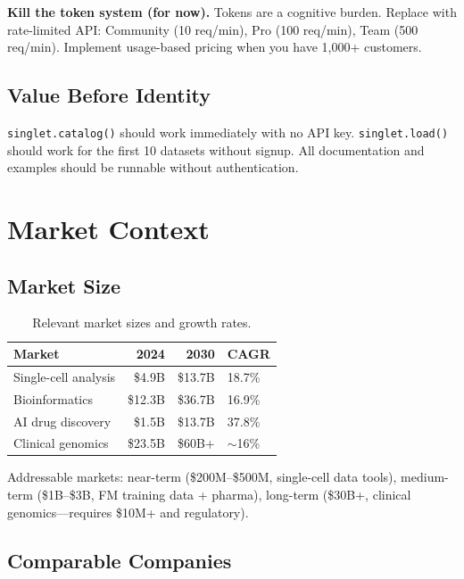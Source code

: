 \documentclass[10pt,twocolumn,letterpaper]{article}
\begin{document}
\textbf{Kill the token system (for now).} Tokens are a cognitive burden. Replace
with rate-limited API: Community (10 req/min), Pro (100 req/min), Team
(500 req/min). Implement usage-based pricing when you have 1,000+ customers.

\subsection{Value Before Identity}

\texttt{singlet.catalog()} should work immediately with no API key.
\texttt{singlet.load()} should work for the first 10 datasets without signup.
All documentation and examples should be runnable without authentication.

\section{Market Context}
\label{sec:market}

\subsection{Market Size}

\begin{table}[h]
\centering
\small
\begin{tabular}{@{}lrrl@{}}
\toprule
\textbf{Market} & \textbf{2024} & \textbf{2030} & \textbf{CAGR} \\
\midrule
Single-cell analysis & \$4.9B & \$13.7B & 18.7\% \\
Bioinformatics & \$12.3B & \$36.7B & 16.9\% \\
AI drug discovery & \$1.5B & \$13.7B & 37.8\% \\
Clinical genomics & \$23.5B & \$60B+ & $\sim$16\% \\
\bottomrule
\end{tabular}
\caption{Relevant market sizes and growth rates.}
\label{tab:markets}
\end{table}

Addressable markets: near-term (\$200M--\$500M, single-cell data tools),
medium-term (\$1B--\$3B, FM training data + pharma), long-term (\$30B+,
clinical genomics---requires \$10M+ and regulatory).

\subsection{Comparable Companies}
\end{document}
